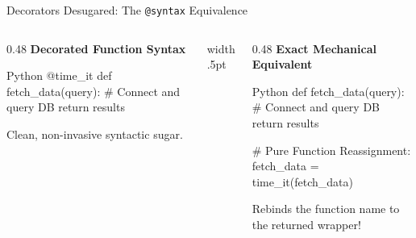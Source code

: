 \begin{frame}[fragile]{Decorators Desugared: The \texttt{@syntax} Equivalence}
  \begin{columns}[T,onlytextwidth]
    \begin{column}{0.48\textwidth}
      {\small\bfseries\color{UpGradNight}Decorated Function Syntax}\par\vspace{0.08cm}
      \begin{CodeBlock}{Python}
@time_it
def fetch_data(query):
    # Connect and query DB
    return results
      \end{CodeBlock}
      \vspace{0.08cm}
      {\scriptsize\color{UpGradSlate}Clean, non-invasive syntactic sugar.}
    \end{column}
    \hfill{\color{UpGradRule}\vrule width .5pt}\hfill
    \begin{column}{0.48\textwidth}
      {\small\bfseries\color{AWSBlue}Exact Mechanical Equivalent}\par\vspace{0.08cm}
      \begin{CodeBlock}{Python}
def fetch_data(query):
    # Connect and query DB
    return results

# Pure Function Reassignment:
fetch_data = time_it(fetch_data)
      \end{CodeBlock}
      \vspace{0.08cm}
      {\scriptsize\color{AWSBlue}Rebinds the function name to the returned wrapper!}
    \end{column}
  \end{columns}
  \vspace{0.18cm}
\end{frame}

